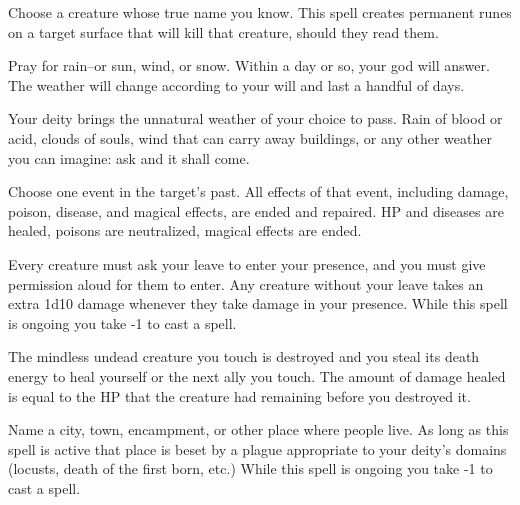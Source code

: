 

 Choose a creature whose true name you know. This spell creates permanent runes on a target surface that will kill that creature, should they read them.




 Pray for rain--or sun, wind, or snow. Within a day or so, your god will answer. The weather will change according to your will and last a handful of days.




 Your deity brings the unnatural weather of your choice to pass. Rain of blood or acid, clouds of souls, wind that can carry away buildings, or any other weather you can imagine: ask and it shall come.




 Choose one event in the target's past. All effects of that event, including damage, poison, disease, and magical effects, are ended and repaired. HP and diseases are healed, poisons are neutralized, magical effects are ended.





 Every creature must ask your leave to enter your presence, and you must give permission aloud for them to enter. Any creature without your leave takes an extra 1d10 damage whenever they take damage in your presence. While this spell is ongoing you take -1 to cast a spell.




 The mindless undead creature you touch is destroyed and you steal its death energy to heal yourself or the next ally you touch. The amount of damage healed is equal to the HP that the creature had remaining before you destroyed it.

\newpage
{}



 Name a city, town, encampment, or other place where people live. As long as this spell is active that place is beset by a plague appropriate to your deity's domains (locusts, death of the first born, etc.) While this spell is ongoing you take -1 to cast a spell.



